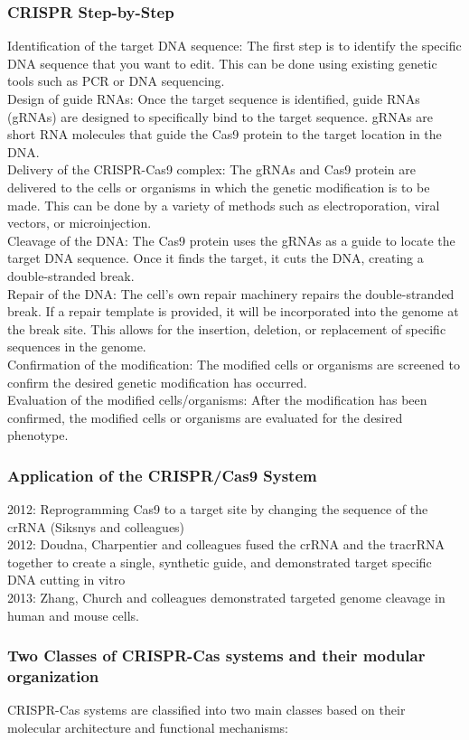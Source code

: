 \begin{itemize}
\begin{itemize}
\subsubsection{CRISPR Step-by-Step}
Identification of the target DNA sequence: The first step is to identify the specific DNA sequence that you want to edit. This can be done using existing genetic tools such as PCR or DNA sequencing.
\\Design of guide RNAs: Once the target sequence is identified, guide RNAs (gRNAs) are designed to specifically bind to the target sequence. gRNAs are short RNA molecules that guide the Cas9 protein to the target location in the DNA.
\\Delivery of the CRISPR-Cas9 complex: The gRNAs and Cas9 protein are delivered to the cells or organisms in which the genetic modification is to be made. This can be done by a variety of methods such as electroporation, viral vectors, or microinjection.
\\Cleavage of the DNA: The Cas9 protein uses the gRNAs as a guide to locate the target DNA sequence. Once it finds the target, it cuts the DNA, creating a double-stranded break.
\\Repair of the DNA: The cell's own repair machinery repairs the double-stranded break. If a repair template is provided, it will be incorporated into the genome at the break site. This allows for the insertion, deletion, or replacement of specific sequences in the genome.
\\Confirmation of the modification: The modified cells or organisms are screened to confirm the desired genetic modification has occurred.
\\Evaluation of the modified cells/organisms: After the modification has been confirmed, the modified cells or organisms are evaluated for the desired phenotype.

\subsubsection{Application of the CRISPR/Cas9 System}
2012: Reprogramming Cas9 to a target site by changing the sequence of the crRNA
(Siksnys and colleagues)
\\2012: Doudna, Charpentier and colleagues fused the crRNA and the tracrRNA
together to create a single, synthetic guide, and demonstrated target specific
DNA cutting in vitro
\\2013: Zhang, Church and colleagues demonstrated targeted genome cleavage in
human and mouse cells.
\subsubsection{Two Classes of CRISPR-Cas systems and their modular organization}
CRISPR-Cas systems are classified into two main classes based on their molecular architecture and functional mechanisms:


\end{itemize}
\end{itemize}

